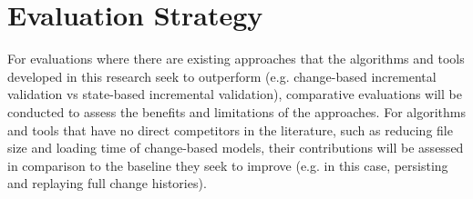 \documentclass[12pt, a4paper]{report} \usepackage[titletoc]{appendix}
\begin{document}

\section{Evaluation Strategy}
\label{sec:evaluation_strategy}
For evaluations where there are existing approaches that the algorithms and tools developed in this research seek to outperform (e.g. change-based incremental validation vs state-based incremental validation), comparative evaluations will be conducted to assess the benefits and limitations of the approaches. For algorithms and tools that have no direct competitors in the literature, such as reducing file size and loading time of change-based models, their contributions will be assessed in comparison to the baseline they seek to improve (e.g. in this case, persisting and replaying full change histories).  
\end{document}
